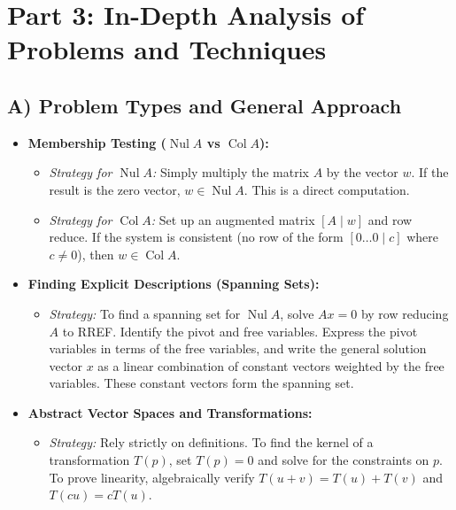 \documentclass[11pt]{article}
\begin{document}
\newpage

\section{Part 3: In-Depth Analysis of Problems and Techniques}

\subsection{A) Problem Types and General Approach}
\begin{itemize}
    \item \textbf{Membership Testing ($\operatorname{Nul} A$ vs $\operatorname{Col} A$):} 
    \begin{itemize}
        \item \textit{Strategy for $\operatorname{Nul} A$:} Simply multiply the matrix $A$ by the vector $w$. If the result is the zero vector, $w \in \operatorname{Nul} A$. This is a direct computation.
        \item \textit{Strategy for $\operatorname{Col} A$:} Set up an augmented matrix $[A \mid w]$ and row reduce. If the system is consistent (no row of the form $[0 \dots 0 \mid c]$ where $c \neq 0$), then $w \in \operatorname{Col} A$.
    \end{itemize}
    \item \textbf{Finding Explicit Descriptions (Spanning Sets):}
    \begin{itemize}
        \item \textit{Strategy:} To find a spanning set for $\operatorname{Nul} A$, solve $Ax = 0$ by row reducing $A$ to RREF. Identify the pivot and free variables. Express the pivot variables in terms of the free variables, and write the general solution vector $x$ as a linear combination of constant vectors weighted by the free variables. These constant vectors form the spanning set.
    \end{itemize}
    \item \textbf{Abstract Vector Spaces and Transformations:}
    \begin{itemize}
        \item \textit{Strategy:} Rely strictly on definitions. To find the kernel of a transformation $T(p)$, set $T(p) = 0$ and solve for the constraints on $p$. To prove linearity, algebraically verify $T(u+v) = T(u) + T(v)$ and $T(cu) = cT(u)$.
    \end{itemize}
\end{itemize}
\end{document}

